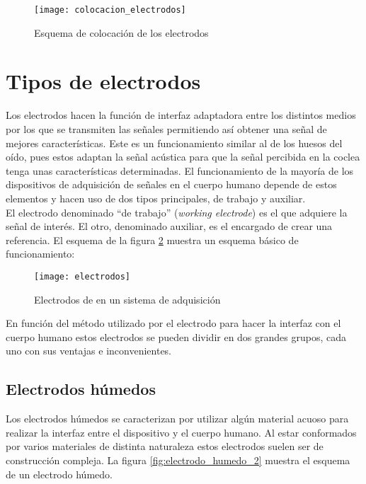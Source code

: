 \begin{figure} [H]
    \centering
    \texttt{[image: colocacion\_electrodos]}
    \caption{Esquema de colocación de los electrodos \cite{apuntes}}
    \label{fig:colocacion_electrodos}
\end{figure}

\clearpage

\section{Tipos de electrodos\label{sec:Tipos_Electrodos}}

Los electrodos hacen la función de interfaz adaptadora entre los distintos medios por los que se transmiten las señales permitiendo así obtener una señal de mejores características. Este es un funcionamiento similar al de los huesos del oído, pues estos adaptan la señal acústica para que la señal percibida en la coclea tenga unas características determinadas. El funcionamiento de la mayoría de los dispositivos de adquisición de señales en el cuerpo humano depende de estos elementos y hacen uso de dos tipos principales, de trabajo y auxiliar.
\\El electrodo denominado ``de trabajo'' (\textit{working electrode}) es el que adquiere la señal de interés. El otro, denominado auxiliar, es el encargado de crear una referencia. El esquema de la figura \ref{fig:electrodos} muestra un esquema básico de funcionamiento:

\begin{figure} [h]
    \centering
    \texttt{[image: electrodos]}
    \caption{Electrodos de en un sistema de adquisición \cite{apuntes}}
    \label{fig:electrodos}
\end{figure}

En función del método utilizado por el electrodo para hacer la interfaz con el cuerpo humano estos electrodos se pueden dividir en dos grandes grupos, cada uno con sus ventajas e inconvenientes. 

\subsection{Electrodos húmedos\label{sec:Elec_humedos}}

Los electrodos húmedos se caracterizan por utilizar algún material acuoso para realizar la interfaz entre el dispositivo y el cuerpo humano. Al estar conformados por varios materiales de distinta naturaleza estos electrodos suelen ser de construcción compleja. La figura \ref{fig:electrodo_humedo_2} muestra el esquema de un electrodo húmedo.

